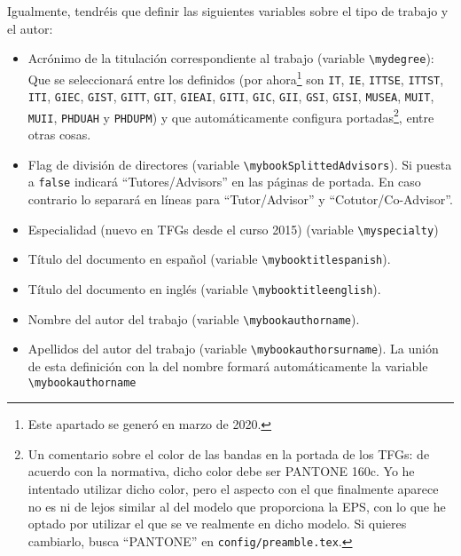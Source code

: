 Igualmente, tendréis que definir las siguientes variables sobre el tipo
de trabajo y el autor:

\begin{itemize} 
\item Acrónimo de la titulación correspondiente al trabajo (variable
  \texttt{\textbackslash{}mydegree}): Que se seleccionará entre los
  definidos (por ahora\footnote{Este apartado se generó en marzo de
    2020.} son \texttt{IT}, \texttt{IE}, \texttt{ITTSE}, \texttt{ITTST},
  \texttt{ITI}, \texttt{GIEC}, \texttt{GIST}, \texttt{GITT},
  \texttt{GIT}, \texttt{GIEAI}, \texttt{GITI}, \texttt{GIC},
  \texttt{GII}, \texttt{GSI}, \texttt{GISI}, \texttt{MUSEA},
  \texttt{MUIT}, \texttt{MUII}, \texttt{PHDUAH} y \texttt{PHDUPM}) y que
  automáticamente configura portadas\footnote{Un comentario sobre el
    color de las bandas en la portada de los TFGs: de acuerdo con la
    normativa, dicho color debe ser PANTONE 160c. Yo he intentado
    utilizar dicho color, pero el aspecto con el que finalmente aparece
    no es ni de lejos similar al del modelo que proporciona la EPS, con
    lo que he optado por utilizar el que se ve realmente en dicho
    modelo. Si quieres cambiarlo, busca ``PANTONE'' en
    \texttt{config/preamble.tex}.}, entre otras cosas.

\item Flag de división de directores (variable
  \texttt{\textbackslash{}mybookSplittedAdvisors}). Si puesta a
  \texttt{false} indicará ``Tutores/Advisors'' en las páginas de
  portada. En caso contrario lo separará en líneas para
  ``Tutor/Advisor'' y ``Cotutor/Co-Advisor''.

\item Especialidad (nuevo en TFGs desde el curso 2015) (variable
  \texttt{\textbackslash{}myspecialty})


\item Título del documento en español (variable
  \texttt{\textbackslash{}mybooktitlespanish}).
\item Título del documento en inglés (variable
  \texttt{\textbackslash{}mybooktitleenglish}).

\item Nombre del autor del trabajo (variable
  \texttt{\textbackslash{}mybookauthorname}).
\item Apellidos del autor del trabajo (variable
  \texttt{\textbackslash{}mybookauthorsurname}). La unión de esta
  definición con la del nombre formará automáticamente la variable
  \texttt{\textbackslash{}mybookauthorname}


\end{itemize}

